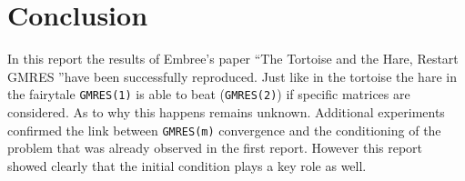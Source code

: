 \section{Conclusion}
In this report the results of Embree's paper \textquotedblleft The Tortoise and the Hare, Restart GMRES \textquotedblright have been successfully reproduced. Just like in the tortoise the hare in the fairytale \texttt{GMRES(1)} is able to beat (\texttt{GMRES(2)}) if specific matrices are considered. As to why this happens remains unknown. Additional experiments confirmed the link between \texttt{GMRES(m)} convergence and the conditioning of the problem that was already observed in the first report. However this report showed clearly that the initial condition plays a key role as well.